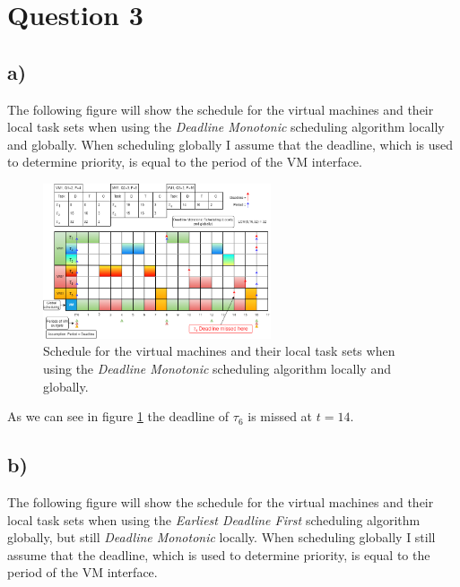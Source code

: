 \section*{Question 3}
    \subsection*{a)}
    The following figure will show the schedule for the virtual machines and their local task sets when using the \textit{Deadline Monotonic} scheduling algorithm locally and globally. When scheduling globally I assume that the deadline, which is used to determine priority, is equal to the period of the VM interface.\\
    \begin{figure}[H]
        \centering
        \includegraphics[width=0.6\textwidth]{images/AssQ3a.png}
        \caption{Schedule for the virtual machines and their local task sets when using the \textit{Deadline Monotonic} scheduling algorithm locally and globally.}
        \label{fig:3a}
    \end{figure}
    As we can see in figure \ref{fig:3a} the deadline of $\tau_6$ is missed at $t=14$. 

    \subsection*{b)}
    The following figure will show the schedule for the virtual machines and their local task sets when using the \textit{Earliest Deadline First} scheduling algorithm globally, but still \textit{Deadline Monotonic} locally. When scheduling globally I still assume that the deadline, which is used to determine priority, is equal to the period of the VM interface.\\

